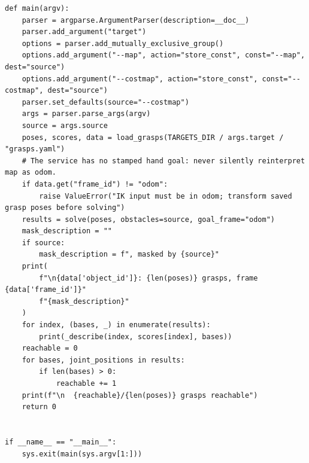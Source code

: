 \documentclass[11pt,a4paper]{book}
\begin{document}
\begin{lstlisting}
def main(argv):
    parser = argparse.ArgumentParser(description=__doc__)
    parser.add_argument("target")
    options = parser.add_mutually_exclusive_group()
    options.add_argument("--map", action="store_const", const="--map", dest="source")
    options.add_argument("--costmap", action="store_const", const="--costmap", dest="source")
    parser.set_defaults(source="--costmap")
    args = parser.parse_args(argv)
    source = args.source
    poses, scores, data = load_grasps(TARGETS_DIR / args.target / "grasps.yaml")
    # The service has no stamped hand goal: never silently reinterpret map as odom.
    if data.get("frame_id") != "odom":
        raise ValueError("IK input must be in odom; transform saved grasp poses before solving")
    results = solve(poses, obstacles=source, goal_frame="odom")
    mask_description = ""
    if source:
        mask_description = f", masked by {source}"
    print(
        f"\n{data['object_id']}: {len(poses)} grasps, frame {data['frame_id']}"
        f"{mask_description}"
    )
    for index, (bases, _) in enumerate(results):
        print(_describe(index, scores[index], bases))
    reachable = 0
    for bases, joint_positions in results:
        if len(bases) > 0:
            reachable += 1
    print(f"\n  {reachable}/{len(poses)} grasps reachable")
    return 0


if __name__ == "__main__":
    sys.exit(main(sys.argv[1:]))
\end{lstlisting}
\end{document}
